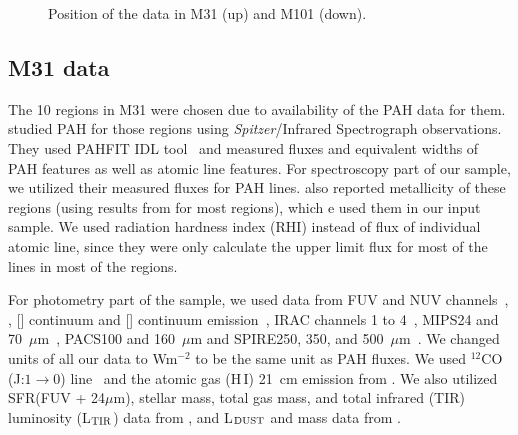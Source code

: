   \begin{figure}
    \hfill
    \caption{Position of the data in M31 (up) and M101 (down).}
    \label{fig:dummy}
  \end{figure}

    \subsection{M31 data}
      
     
     The 10 regions in M31 were chosen due to availability of the PAH data for them. 
     \cite{Dim15} studied PAH for those regions using {\it Spitzer}/Infrared Spectrograph\citep[IRS,][]{Houck04b} observations. 
     They used {\tiny PAHFIT IDL} tool~\citep{Smith07b} and measured fluxes and equivalent widths of PAH features as well as atomic line features.
     For spectroscopy part of our sample, we utilized their measured fluxes for PAH lines. 
     \cite{Dim15} also reported metallicity of these regions (using results from \cite{Sanders12} for most regions), which e used them in our input sample.
     We used radiation hardness index (RHI) instead of flux of individual atomic line, since they were only calculate the upper limit flux for most of the lines in most of the regions.
     
     For photometry part of the sample, we used data from \GALEX FUV and NUV channels~\citep{Martin05}, \halpha, [\sii] continuum and [\oiii] continuum emission~\citep{Massey07}, IRAC channels 1 to 4~\citep{Barmby06}, MIPS24 and 70~$\mu$m~\citep{Gordon06}, PACS100 and 160~$\mu$m and SPIRE250, 350, and 500~$\mu$m~\citep{Fritz12}.
     We changed units of all our data to Wm$^{-2}$ to be the same unit as PAH fluxes.
     We used $^{12}$CO (J:$1\rightarrow0$) line~\citep{Nieten06} and the atomic gas (H\,{\sc I}) 21~cm emission from \cite{Chemin09}.
     We also utilized SFR(FUV + 24$\mu$m), stellar mass, total gas mass, and total infrared (TIR) luminosity (L$_{\rm TIR}$) data from \cite{Rahmani16}, and L$_{\rm DUST}$ and mass data from \cite{Draine14}.


